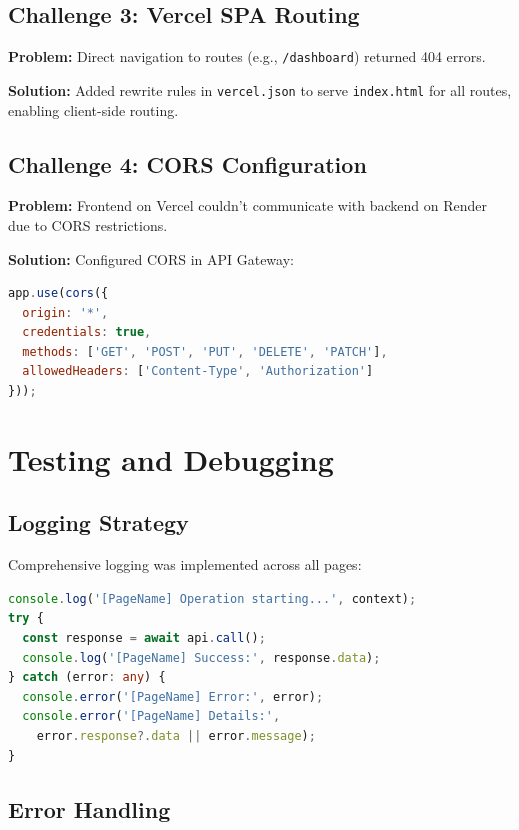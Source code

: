 \documentclass[12pt,a4paper]{article}
\begin{document}
\subsection{Challenge 3: Vercel SPA Routing}

\textbf{Problem:} Direct navigation to routes (e.g., \texttt{/dashboard}) returned 404 errors.

\textbf{Solution:} Added rewrite rules in \texttt{vercel.json} to serve \texttt{index.html} for all routes, enabling client-side routing.

\subsection{Challenge 4: CORS Configuration}

\textbf{Problem:} Frontend on Vercel couldn't communicate with backend on Render due to CORS restrictions.

\textbf{Solution:} Configured CORS in API Gateway:

\begin{lstlisting}[language=JavaScript]
app.use(cors({
  origin: '*',
  credentials: true,
  methods: ['GET', 'POST', 'PUT', 'DELETE', 'PATCH'],
  allowedHeaders: ['Content-Type', 'Authorization']
}));
\end{lstlisting}

\section{Testing and Debugging}

\subsection{Logging Strategy}

Comprehensive logging was implemented across all pages:

\begin{lstlisting}[language=TypeScript, caption=Logging Example]
console.log('[PageName] Operation starting...', context);
try {
  const response = await api.call();
  console.log('[PageName] Success:', response.data);
} catch (error: any) {
  console.error('[PageName] Error:', error);
  console.error('[PageName] Details:', 
    error.response?.data || error.message);
}
\end{lstlisting}

\subsection{Error Handling}
\end{document}

